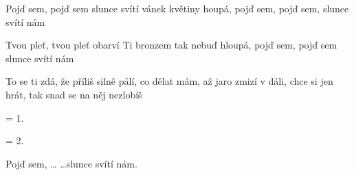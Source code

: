 
\beginverse{}
Pojď sem, pojď sem slunce svítí
vánek květiny houpá,
pojď sem, pojď sem, slunce svítí nám
\endverse{}

\beginverse{}
Tvou pleť, tvou pleť obarví Ti bronzem tak nebuď hloupá, pojď sem, pojď sem
slunce svítí nám
\endverse{}

\beginchorus{}
To se ti zdá, že příliš silně pálí,
co dělat mám, až jaro zmizí v dáli,
chce si jen hrát, tak snad se na něj nezlobíš
\endchorus{}

\beginverse{}
= 1.
\endverse{}

\beginverse{}
= 2.
\endverse{}

\beginchorus{}
\phantom{}
\endchorus{}

\beginverse{}
Pojď sem, \ldots{}
\ldots{}slunce svítí nám.
\endverse{}

\endsong{}
